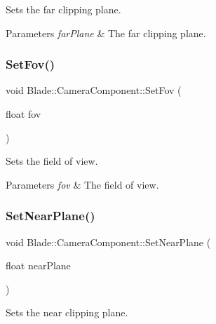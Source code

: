 Sets the far clipping plane. 


\begin{DoxyParams}{Parameters}
{\em far\+Plane} & The far clipping plane. \\
\hline
\end{DoxyParams}
\mbox{\label{class_blade_1_1_camera_component_a7d3b2934f93bdb601b177c23e9c1088f}} 
\subsubsection{\texorpdfstring{Set\+Fov()}{SetFov()}}
{\footnotesize\ttfamily void Blade\+::\+Camera\+Component\+::\+Set\+Fov (\begin{DoxyParamCaption}\item[{float}]{fov }\end{DoxyParamCaption})\hspace{0.3cm}{\ttfamily [noexcept]}}



Sets the field of view. 


\begin{DoxyParams}{Parameters}
{\em fov} & The field of view. \\
\hline
\end{DoxyParams}
\mbox{\label{class_blade_1_1_camera_component_a808877ff7c5af8c68f900d44ab2e554b}} 
\subsubsection{\texorpdfstring{Set\+Near\+Plane()}{SetNearPlane()}}
{\footnotesize\ttfamily void Blade\+::\+Camera\+Component\+::\+Set\+Near\+Plane (\begin{DoxyParamCaption}\item[{float}]{near\+Plane }\end{DoxyParamCaption})\hspace{0.3cm}{\ttfamily [noexcept]}}



Sets the near clipping plane. 


